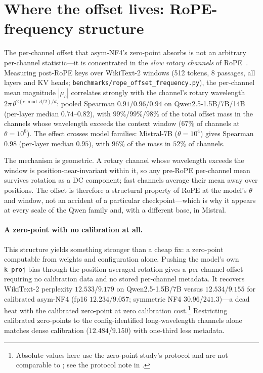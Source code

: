 \documentclass{article}
\theoremstyle{plain}
\theoremstyle{definition}
\begin{document}
\section{Where the offset lives: RoPE-frequency structure}
\label{sec:rope}
The per-channel offset that asym-NF4's zero-point absorbs is not an arbitrary per-channel
statistic---it is concentrated in the \emph{slow rotary channels} of
RoPE~\citep{su2024roformer}. Measuring post-RoPE keys over WikiText-2 windows (512 tokens, 8
passages, all layers and KV heads; \texttt{benchmarks/rope\_offset\_frequency.py}), the
per-channel mean magnitude $|\mu_c|$ correlates strongly with the channel's rotary wavelength
$2\pi\,\theta^{2(c\bmod d/2)/d}$: pooled Spearman $0.91$/$0.96$/$0.94$ on Qwen2.5-1.5B/7B/14B
(per-layer median $0.74$--$0.82$), with $99\%$/$99\%$/$98\%$ of the total offset mass in the
channels whose wavelength exceeds the context window ($67\%$ of channels at $\theta{=}10^6$).
The effect crosses model families: Mistral-7B ($\theta{=}10^4$) gives Spearman $0.98$
(per-layer median $0.95$), with $96\%$ of the mass in $52\%$ of channels.

The mechanism is geometric. A rotary channel whose wavelength exceeds the window is
position-near-invariant within it, so any pre-RoPE per-channel mean survives rotation as a DC
component; fast channels average their mean away over positions. The offset is therefore a
structural property of RoPE at the model's $\theta$ and window, not an accident of a particular
checkpoint---which is why it appears at every scale of the Qwen family and, with a different
base, in Mistral.

\paragraph{A zero-point with no calibration at all.}
This structure yields something stronger than a cheap fix: a zero-point computable from weights
and configuration alone. Pushing the model's own \texttt{k\_proj} bias through the
position-averaged rotation gives a per-channel offset requiring no calibration data and no
stored per-channel metadata. It recovers WikiText-2 perplexity $12.533$/$9.179$ on
Qwen2.5-1.5B/7B versus $12.534$/$9.155$ for calibrated asym-NF4 (fp16 $12.234$/$9.057$;
symmetric NF4 $30.96$/$241.3$)---a dead heat with the calibrated zero-point at zero calibration
cost.\footnote{Absolute values here use the zero-point study's protocol and are not comparable
to ; see the protocol note in .} Restricting calibrated
zero-points to the config-identified long-wavelength channels alone matches dense calibration
($12.484$/$9.150$) with one-third less metadata.
\end{document}
